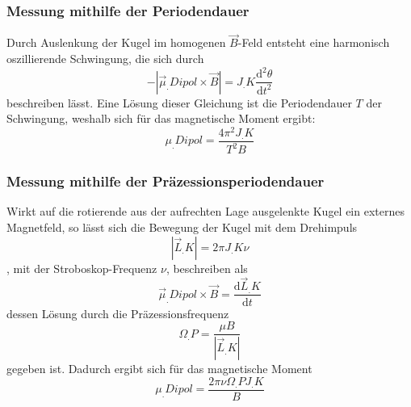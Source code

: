 \subsubsection{Messung mithilfe der Periodendauer}
Durch Auslenkung der Kugel im homogenen $\vec{B}$-Feld entsteht eine harmonisch oszillierende Schwingung, die sich durch
\[-|\vec{\mu}_.{Dipol}\times\vec{B}| = J_.K \frac{\mathrm{d}^2\theta}{\mathrm{d}t^2}\]
beschreiben lässt\cite{V105}.\newline
Eine Lösung dieser Gleichung ist die Periodendauer $T$ der Schwingung,
weshalb sich für das magnetische Moment ergibt:
\begin{equation}
\mu_.{Dipol} = \frac{4\pi^2J_.K}{T^2B}\label{eq:mu2}
\end{equation}

\subsubsection{Messung mithilfe der Präzessionsperiodendauer}
Wirkt auf die rotierende aus der aufrechten Lage ausgelenkte Kugel ein externes Magnetfeld, so lässt sich die Bewegung der Kugel mit dem Drehimpuls 
\[|\vec{L}_.K| = 2\pi J_.K \nu\], mit der Stroboskop-Frequenz $\nu$,
beschreiben als
\[\vec{\mu}_.{Dipol}\times\vec{B} = \frac{\mathrm{d}\vec{L}_.K}{\mathrm{d}t}\]
dessen Lösung durch die Präzessionsfrequenz
\[\Omega_.P = \frac{\mu B}{|\vec{L}_.K|}\]
gegeben ist\cite{V105}.
Dadurch ergibt sich für das magnetische Moment
\begin{equation}
\mu_.{Dipol} = \frac{2\pi\nu\Omega_.PJ_.K}{B}\label{eq:mu3}
\end{equation}
